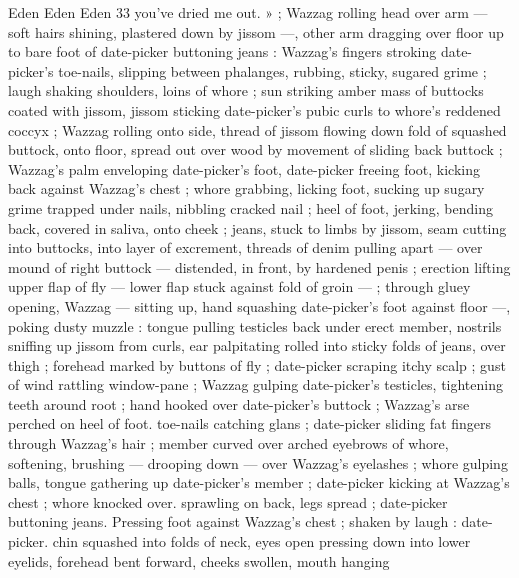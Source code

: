 Eden Eden Eden 33
you've dried me out. » ; Wazzag rolling head over arm — soft hairs
shining, plastered down by jissom —, other arm dragging over floor
up to bare foot of date-picker buttoning jeans : Wazzag's fingers
stroking date-picker's toe-nails, slipping between phalanges,
rubbing, sticky, sugared grime ; laugh shaking shoulders, loins of
whore ; sun striking amber mass of buttocks coated with jissom,
jissom sticking date-picker's pubic curls to whore's reddened coccyx
; Wazzag rolling onto side, thread of jissom flowing down fold of
squashed buttock, onto floor, spread out over wood by movement of
sliding back buttock ; Wazzag's palm enveloping date-picker's foot,
date-picker freeing foot, kicking back against Wazzag’s chest ; whore
grabbing, licking foot, sucking up sugary grime trapped under nails,
nibbling cracked nail ; heel of foot, jerking, bending back, covered in
saliva, onto cheek ; jeans, stuck to limbs by jissom, seam cutting into
buttocks, into layer of excrement, threads of denim pulling apart —
over mound of right buttock — distended, in front, by hardened
penis ; erection lifting upper flap of fly — lower flap stuck against
fold of groin — ; through gluey opening, Wazzag — sitting up, hand
squashing date-picker’s foot against floor —, poking dusty muzzle :
tongue pulling testicles back under erect member, nostrils sniffing up
jissom from curls, ear palpitating rolled into sticky folds of jeans,
over thigh ; forehead marked by buttons of fly ; date-picker scraping
itchy scalp ; gust of wind rattling window-pane ; Wazzag gulping
date-picker's testicles, tightening teeth around root ; hand hooked
over date-picker's buttock ; Wazzag's arse perched on heel of foot.
toe-nails catching glans ; date-picker sliding fat fingers through
Wazzag's hair ; member curved over arched eyebrows of whore,
softening, brushing — drooping down — over Wazzag's eyelashes
; whore gulping balls, tongue gathering up date-picker's member ;
date-picker kicking at Wazzag's chest ; whore knocked over.
sprawling on back, legs spread ; date-picker buttoning jeans.
Pressing foot against Wazzag’s chest ; shaken by laugh : date-picker.
chin squashed into folds of neck, eyes open pressing down into
lower eyelids, forehead bent forward, cheeks swollen, mouth hanging

